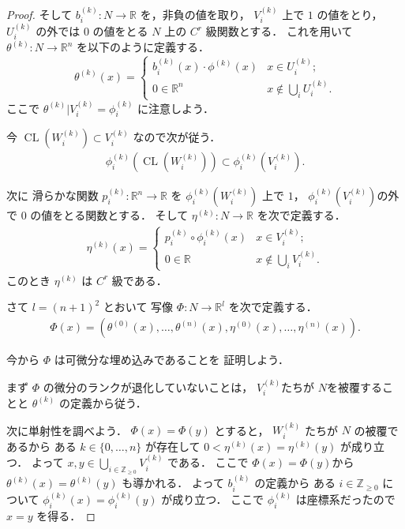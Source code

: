 \documentclass[leqno, a4paper, 12pt]{jsarticle}
\theoremstyle{plain}
\theoremstyle{definition}
\theoremstyle{remark}
\newcommand{\zz}{\mathbb{Z}}
\newcommand{\rr}{\mathbb{R}}
\DeclareMathOperator{\cl}{\mathrm{CL}}
\numberwithin{equation}{section}
\begin{document}
\begin{proof}
そして
$b_{i}^{(k)}\colon N\to \rr$
を，非負の値を取り，
$V_{i}^{(k)}$
上で
$1$
の値をとり，
$U_{i}^{(k)}$
の外では
$0$
の値をとる
$N$
上の
$C^{r}$
級関数とする．
これを用いて
$\theta^{(k)}\colon N\to \rr^{n}$
を以下のように定義する．
\[
\theta^{(k)}(x)=
\begin{cases}
b_{i}^{(k)}(x)\cdot \phi_{}^{(k)}(x)& \text{$x\in U_{i}^{(k)}$};\\
0\in \rr^{n} & \text{$x\not  \in \bigcup_{i}U_{i}^{(k)}$}. 
\end{cases}
\]
ここで
$\theta^{(k)}|V_{i}^{(k)}=\phi_{i}^{(k)}$
に注意しよう．

今
$\cl(W_{i}^{(k)})\subset V_{i}^{(k)}$
なので次が従う．
\begin{align}
\phi_{i}^{(k)}\left(\cl\left(W_{i}^{(k)}\right)\right)\subset \phi_{i}^{(k)}\left(V_{i}^{(k)}\right). 
\end{align}

次に
滑らかな関数
$p_{i}^{(k)}\colon \rr^{n}\to \rr$
を
$\phi_{i}^{(k)}(W_{i}^{(k)})$
上で
$1$，
$\phi_{i}^{(k)}(V_{i}^{(k)})$の外で
$0$
の値をとる関数とする．
そして
$\eta^{(k)}\colon N\to \rr$
を次で定義する．
\begin{align}
\eta^{(k)}(x)=
\begin{cases}
p_{i}^{(k)}\circ \phi_{i}^{(k)}(x) & \text{$x\in V_{i}^{(k)}$};\\
0 \in \rr& \text{$x\not\in \bigcup_{i}V_{i}^{(k)}$}. 
\end{cases}
\end{align}
このとき
$\eta^{(k)}$
は
$C^{r}$
級である．




さて
$l=(n+1)^{2}$
とおいて
写像
$\Phi\colon N\to \rr^{l}$
を次で定義する．
\begin{align}
\Phi(x)=(\theta^{(0)}(x), \dots, \theta^{(n)}(x), 
\eta^{(0)}(x), \dots, \eta^{(n)}(x)). 
\end{align}


今から
$\Phi$
は可微分な埋め込みであることを
証明しよう．

まず
$\Phi$
の微分のランクが退化していないことは，
$V_{i}^{(k)}$たちが
$N$を被覆することと
$\theta^{(k)}$
の定義から従う．



次に単射性を調べよう．
$\Phi(x)=\Phi(y)$
とすると，
$W_{i}^{(k)}$
たちが
$N$
の被覆であるから
ある
$k\in \{0, \dots,  n\}$
が存在して
$0<\eta^{(k)}(x)=\eta^{(k)}(y)$
が成り立つ．
よって
$x, y\in\bigcup_{i\in \zz_{\ge 0}}V_{i}^{(k)}$
である．
ここで
$\Phi(x)=\Phi(y)$から
$\theta^{(k)}(x)=\theta^{(k)}(y)$
も導かれる．
よって
$b_{i}^{(k)}$
の定義から
ある
$i\in \zz_{\ge 0}$
について
$\phi_{i}^{(k)}(x)=\phi_{i}^{(k)}(y)$
が成り立つ．
ここで
$\phi_{i}^{(k)}$
は座標系だったので
$x=y$
を得る．


\end{proof}
\end{document}
